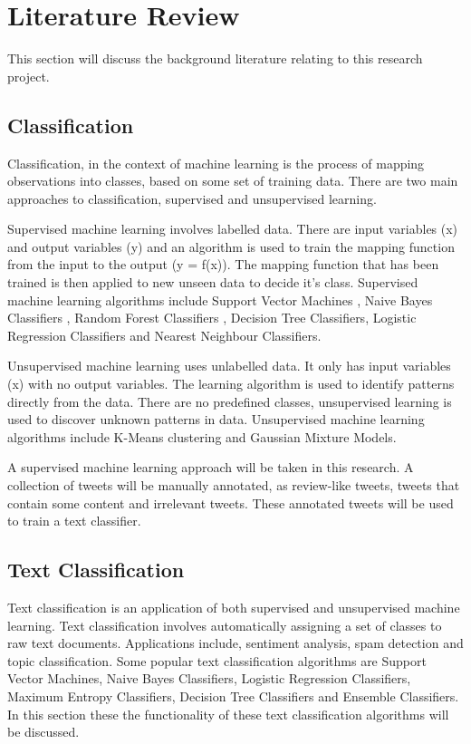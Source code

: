 \chapter{Literature Review}

This section will discuss the background literature relating to this research project.

\section{Classification}

Classification, in the context of machine learning is the process of mapping observations into classes, based on some set of training data. There are two main approaches to classification, supervised and unsupervised learning. 

Supervised machine learning \cite{supervised2007} involves labelled data. There are input variables (x) and output variables (y) and an algorithm is used to train the mapping function from the input to the output (y = f(x)). The mapping function that has been trained is then applied to new unseen data to decide it's class. Supervised machine learning algorithms include Support Vector Machines \cite{Vapnik1995,Vapnik21995}, Naive Bayes Classifiers \cite{NaiveBayes1998}, Random Forest Classifiers \cite{Breiman2001}, Decision Tree Classifiers, Logistic Regression Classifiers and Nearest Neighbour Classifiers.

Unsupervised machine learning uses unlabelled data. It only has input variables (x) with no output variables. The learning algorithm is used to identify patterns directly from the data. There are no predefined classes, unsupervised learning is used to discover unknown patterns in data. Unsupervised machine learning algorithms include K-Means clustering and Gaussian Mixture Models. 

A supervised machine learning approach will be taken in this research. A collection of tweets will be manually annotated, as review-like tweets, tweets that contain some content and irrelevant tweets. These annotated tweets will be used to train a text classifier.

\section{Text Classification}

Text classification \cite{khan2010} is an application of both supervised and unsupervised machine learning. Text classification involves automatically assigning a set of classes to raw text documents. Applications include, sentiment analysis, spam detection and topic classification. Some popular text classification algorithms are Support Vector Machines, Naive Bayes Classifiers, Logistic Regression Classifiers, Maximum Entropy Classifiers, Decision Tree Classifiers and Ensemble Classifiers. In this section these the functionality of these text classification algorithms will be discussed.

